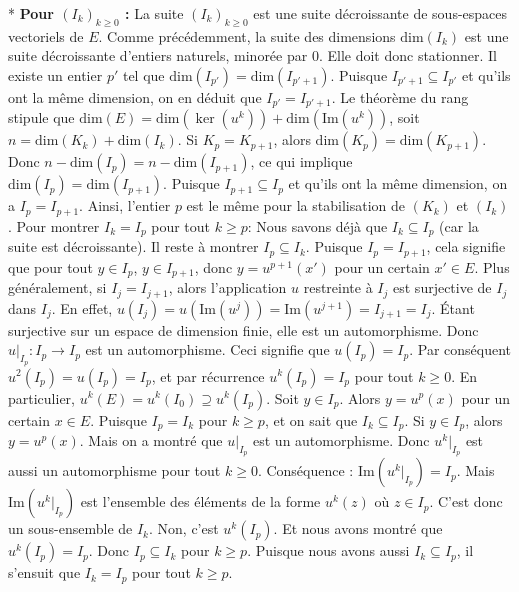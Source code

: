 \documentclass{report}
\begin{document}
    *   \textbf{Pour $(I_k)_{k \ge 0}$ :}
        La suite $(I_k)_{k \ge 0}$ est une suite décroissante de sous-espaces vectoriels de $E$.
        Comme précédemment, la suite des dimensions $\mathrm{dim}(I_k)$ est une suite décroissante d'entiers naturels, minorée par $0$.
        Elle doit donc stationner. Il existe un entier $p'$ tel que $\mathrm{dim}(I_{p'}) = \mathrm{dim}(I_{p'+1})$.
        Puisque $I_{p'+1} \subseteq I_{p'}$ et qu'ils ont la même dimension, on en déduit que $I_{p'} = I_{p'+1}$.
        Le théorème du rang stipule que $\mathrm{dim}(E) = \mathrm{dim}(\ker(u^k)) + \mathrm{dim}(\mathrm{Im}(u^k))$, soit $n = \mathrm{dim}(K_k) + \mathrm{dim}(I_k)$.
        Si $K_p = K_{p+1}$, alors $\mathrm{dim}(K_p) = \mathrm{dim}(K_{p+1})$.
        Donc $n - \mathrm{dim}(I_p) = n - \mathrm{dim}(I_{p+1})$, ce qui implique $\mathrm{dim}(I_p) = \mathrm{dim}(I_{p+1})$.
        Puisque $I_{p+1} \subseteq I_p$ et qu'ils ont la même dimension, on a $I_p = I_{p+1}$.
        Ainsi, l'entier $p$ est le même pour la stabilisation de $(K_k)$ et $(I_k)$.
        Pour montrer $I_k = I_p$ pour tout $k \ge p$:
        Nous savons déjà que $I_k \subseteq I_p$ (car la suite est décroissante).
        Il reste à montrer $I_p \subseteq I_k$.
        Puisque $I_p = I_{p+1}$, cela signifie que pour tout $y \in I_p$, $y \in I_{p+1}$, donc $y = u^{p+1}(x')$ pour un certain $x' \in E$.
        Plus généralement, si $I_j = I_{j+1}$, alors l'application $u$ restreinte à $I_j$ est surjective de $I_j$ dans $I_j$. En effet, $u(I_j) = u(\mathrm{Im}(u^j)) = \mathrm{Im}(u^{j+1}) = I_{j+1} = I_j$. Étant surjective sur un espace de dimension finie, elle est un automorphisme.
        Donc $u|_{I_p} : I_p \to I_p$ est un automorphisme.
        Ceci signifie que $u(I_p) = I_p$. Par conséquent $u^2(I_p) = u(I_p) = I_p$, et par récurrence $u^k(I_p) = I_p$ pour tout $k \ge 0$.
        En particulier, $u^k(E) = u^k(I_0) \supseteq u^k(I_p)$.
        Soit $y \in I_p$. Alors $y = u^p(x)$ pour un certain $x \in E$.
        Puisque $I_p = I_k$ pour $k \ge p$, et on sait que $I_k \subseteq I_p$.
        Si $y \in I_p$, alors $y = u^p(x)$. Mais on a montré que $u|_{I_p}$ est un automorphisme.
        Donc $u^k|_{I_p}$ est aussi un automorphisme pour tout $k \ge 0$.
        Conséquence : $\mathrm{Im}(u^k|_{I_p}) = I_p$.
        Mais $\mathrm{Im}(u^k|_{I_p})$ est l'ensemble des éléments de la forme $u^k(z)$ où $z \in I_p$.
        C'est donc un sous-ensemble de $I_k$.
        Non, c'est $u^k(I_p)$. Et nous avons montré que $u^k(I_p) = I_p$.
        Donc $I_p \subseteq I_k$ pour $k \ge p$.
        Puisque nous avons aussi $I_k \subseteq I_p$, il s'ensuit que $I_k = I_p$ pour tout $k \ge p$.
\end{document}
